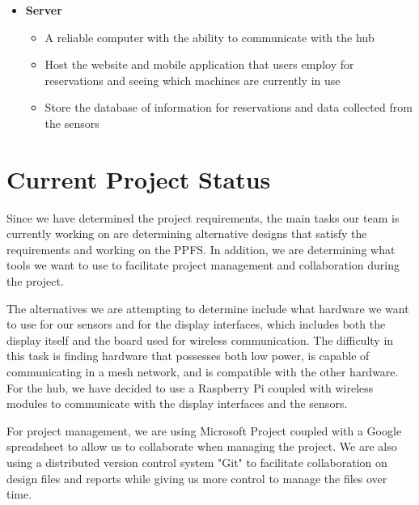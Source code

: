 \documentclass[letterpaper,11pt]{./templates/texMemo} %
\begin{document}
\begin{itemize}
    \item{\textbf{Server}}
    \begin{itemize}
        \item{A reliable computer with the ability to communicate with the hub}
        \item{Host the website and mobile application that users employ for reservations and seeing which machines are currently in use}
        \item{Store the database of information for reservations and data collected from the sensors}
    \end{itemize}
    \end{itemize}

\section{Current Project Status}		

Since we have determined the project requirements, the main tasks our team is currently working on are determining alternative designs that satisfy the requirements and working on the PPFS. In addition, we are determining what tools we want to use to facilitate project management and collaboration during the project.

The alternatives we are attempting to determine include what hardware we want to use for our sensors and for the display interfaces, which includes both the display itself and the board used for wireless communication. The difficulty in this task is finding hardware that possesses both low power, is capable of communicating in a mesh network, and is compatible with the other hardware. For the hub, we have decided to use a Raspberry Pi coupled with wireless modules to communicate with the display interfaces and the sensors.

For project management, we are using Microsoft Project coupled with a Google spreadsheet to allow us to collaborate when managing the project. We are also using a distributed version control system "Git" to facilitate collaboration on design files and reports while giving us more control to manage the files over time.
\end{document}
